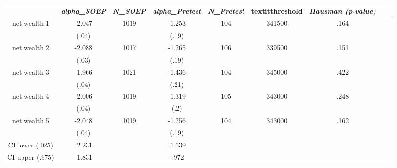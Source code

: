 \begin{tabular}{ccccccccc}
\hline \textit{}&   \textit{alpha\_SOEP}&   \textit{N\_SOEP}&       \textit{alpha\_Pretest}&        \textit{N\_Pretest}&    textit{threshold}&      \textit{Hausman (p-value)}\\ \hline
net wealth 1&-2.047&1019&-1.253&104&341500&.164\\
&(.04)&&(.19)&&&\\
net wealth 2&-2.088&1017&-1.265&106&339500&.151\\
&(.03)&&(.19)&&&\\
net wealth 3&-1.966&1021&-1.436&104&345000&.422\\
&(.04)&&(.21)&&&\\
net wealth 4&-2.006&1019&-1.319&105&343000&.248\\
&(.04)&&(.2)&&&\\
net wealth 5&-2.048&1019&-1.256&104&343000&.162\\
&(.04)&&(.19)&&&\\
CI lower (.025)&-2.231&&-1.639&&&\\
CI upper (.975)&-1.831&&-.972&&&\\
\hline \end{tabular}
